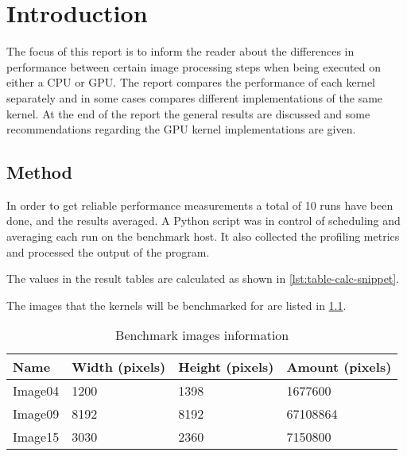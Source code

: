 \documentclass[final]{report}
\begin{document}
\chapter{Introduction}

The focus of this report is to inform the reader about the differences in performance between certain image processing steps when being executed on either a CPU or GPU.
The report compares the performance of each kernel separately and in some cases compares different implementations of the same kernel.
At the end of the report the general results are discussed and some recommendations regarding the GPU kernel implementations are given.

\section{Method}
In order to get reliable performance measurements a total of 10 runs have been done, and the results averaged.
A Python script was in control of scheduling and averaging each run on the benchmark host.
It also collected the profiling metrics and processed the output of the program.

The values in the result tables are calculated as shown in \cref{lst:table-calc-snippet}.


The images that the kernels will be benchmarked for are listed in \cref{tab:image-information}.

\begin{table}[H]
	\centering
	\caption{Benchmark images information}
	\label{tab:image-information}
	\begin{tabular}{llll}
		\toprule
			\textbf{Name} &\textbf{Width (pixels)} & \textbf{Height (pixels)} & \textbf{Amount (pixels)}\\
		\midrule
			Image04 & 1200				& 1398				& 1677600 \\
			Image09 & 8192 				& 8192 				& 67108864 \\
			Image15 & 3030 				& 2360 				& 7150800\\
		\bottomrule
	\end{tabular}
\end{table}

\end{document}
